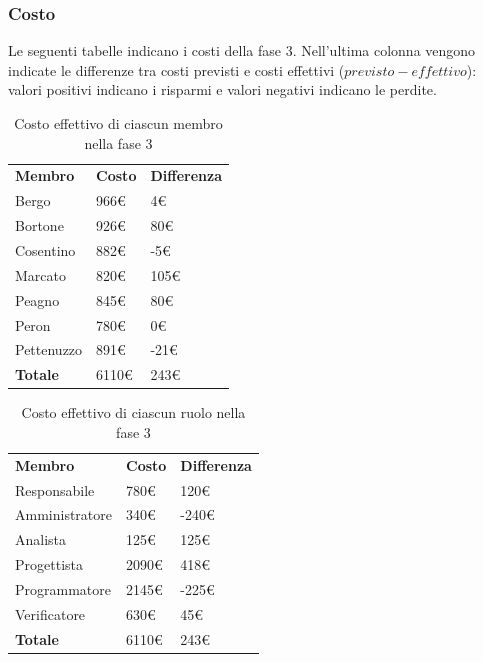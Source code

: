 	\subsubsection{Costo}
		Le seguenti tabelle indicano i costi della fase 3. Nell'ultima colonna vengono indicate le differenze tra costi previsti e costi effettivi ($previsto - effettivo$): valori positivi indicano i risparmi e valori negativi indicano le perdite.
		
		\begin{table}[H]
			\centering
			\begin{tabular}{| l | l | l |}
				\rowcolor{LightBlue}
				\textbf{\color{white}Membro}
				& \textbf{\color{white}Costo}
				& \textbf{\color{white}Differenza}\\
				Bergo		& 966€	& 4€\\
				Bortone		& 926€	& 80€\\
				Cosentino	& 882€	& -5€\\
				Marcato		& 820€	& 105€\\
				Peagno		& 845€	& 80€\\
				Peron		& 780€	& 0€\\
				Pettenuzzo	& 891€	& -21€\\ \hline
				\textbf{Totale} & 6110€	& 243€\\ \hline
			\end{tabular}
			\caption{Costo effettivo di ciascun membro nella fase 3}	
		\end{table}
	
	
	\begin{table}[H]
		\centering
		\begin{tabular}{| l | l |l|}
			\rowcolor{LightBlue}
			\textbf{\color{white}Membro}
			& \textbf{\color{white}Costo}
			& \textbf{\color{white}Differenza}\\
			
			Responsabile	& 780€	& 120€\\
			Amministratore 	& 340€ 	& -240€\\
			Analista 		& 125€ 	& 125€\\
			Progettista 	& 2090€	& 418€\\
			Programmatore 	& 2145€	& -225€\\
			Verificatore 	& 630€	& 45€\\ \hline
			\textbf{Totale} & 6110€	& 243€\\ \hline
		\end{tabular}
		\caption{Costo effettivo di ciascun ruolo nella fase 3}
	\end{table}


